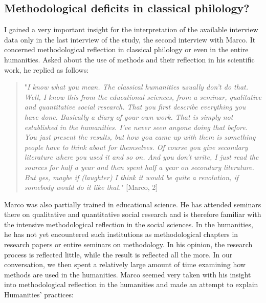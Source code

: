 \documentclass[12pt, a4paper, titlepage, oneside, abstract=true, toc=listof, toc=bibliography]{scrreprt}
\begin{document}
{%
\subsection{Methodological deficits in classical philology?}
\label{sec:method_deficits}
I gained a very important insight for the interpretation of the available interview data only in the last interview of the study, the second interview with Marco. It concerned methodological reflection in classical philology or even in the entire humanities. Asked about the use of methods and their reflection in his scientific work, he replied as follows: 

\begin{quotation}
"\textit{I know what you mean. The classical humanities usually don't do that. Well, I know this from the educational sciences, from a seminar, qualitative and quantitative social research. That you first describe everything you have done. Basically a diary of your own work. That is simply not established in the humanities. I've never seen anyone doing that before. You just present the results, but how you came up with them is something people have to think about for themselves. Of course you give secondary literature where you used it and so on. And you don't write, I just read the sources for half a year and then spent half a year on secondary literature. But yes, maybe if (laughter) I think it would be quite a revolution, if somebody would do it like that.}" [Marco, 2]
\end{quotation}

Marco was also partially trained in educational science. He has attended seminars there on qualitative and quantitative social research and is therefore familiar with the intensive methodological reflection in the social sciences. In the humanities, he has not yet encountered such institutions as methodological chapters in research papers or entire seminars on methodology. In his opinion, the research process is reflected little, while the result is reflected all the more. In our conversation, we then spent a relatively large amount of time examining how methods are used in the humanities. Marco seemed very taken with his insight into methodological reflection in the humanities and made an attempt to explain Humanities' practices:

}
\end{document}
